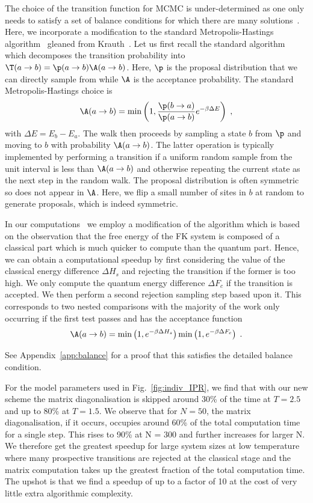 The choice of the transition function for \ac{MCMC} is under-determined as one only needs to satisfy a set of balance conditions for which there are many solutions~\cite{kellyReversibilityStochasticNetworks1981}. Here, we incorporate a modification to the standard Metropolis-Hastings algorithm~\cite{hastingsMonteCarloSampling1970} gleaned from Krauth~\cite{krauthIntroductionMonteCarlo1998}. Let us first recall the standard algorithm which decomposes the transition probability into \(\T(a \to b) = \p(a \to b)\A(a \to b)\). Here,  \(\p\) is the proposal distribution that we can directly sample from while \(\A\) is the acceptance probability. The standard Metropolis-Hastings choice is 
\[\A(a \to b) = \min\left(1, \frac{\p(b\to a)}{\p(a\to b)} e^{-\beta \Delta E}\right)\;,\]
with \(\Delta E = E_b - E_a\). The walk then proceeds by sampling a state \(b\) from \(\p\) and moving to \(b\) with probability \(\A(a \to b)\). The latter operation is typically implemented by performing a transition if a uniform random sample from the unit interval is less than \(\A(a \to b)\) and otherwise repeating the current state as the next step in the random walk. The proposal distribution is often symmetric so does not appear in \(\A\). Here, we flip a small number of sites in \(b\) at random to generate proposals, which is indeed symmetric. 

In our computations~\cite{hodsonMCMCFKModel2021} we employ a modification of the algorithm which is based on the observation that the free energy of the \ac{FK} system is composed of a classical part which is much quicker to compute than the quantum part. Hence, we can obtain a computational speedup by first considering the value of the classical energy difference \(\Delta H_s\) and rejecting the transition if the former is too high. We only compute the quantum energy difference \(\Delta F_c\) if the transition is accepted. We then 
perform a second rejection sampling step based upon it. This corresponds to two nested comparisons with the majority of the work only occurring if the first test passes and has the acceptance function 
\[\A(a \to b) = \min\left(1, e^{-\beta \Delta H_s}\right)\min\left(1, e^{-\beta \Delta F_c}\right)\;.\]

See Appendix~\ref{app:balance} for a proof that this satisfies the detailed balance condition.

For the model parameters used in Fig.~\ref{fig:indiv_IPR}, we find that with our new scheme the matrix diagonalisation is skipped around 30\% of the time at \(T = 2.5\) and up to 80\% at \(T = 1.5\). We observe that for  \(N = 50\), the matrix diagonalisation, if it occurs, occupies around 60\% of the total computation time for a single step. This rises to 90\% at N = 300 and further increases for larger N. We therefore get the greatest speedup for large system sizes at low temperature where many prospective transitions are rejected at the classical stage and the matrix computation takes up the greatest fraction of the total computation time. The upshot is that we find a  speedup of up to a factor of 10 at the cost of very little extra algorithmic complexity. 

